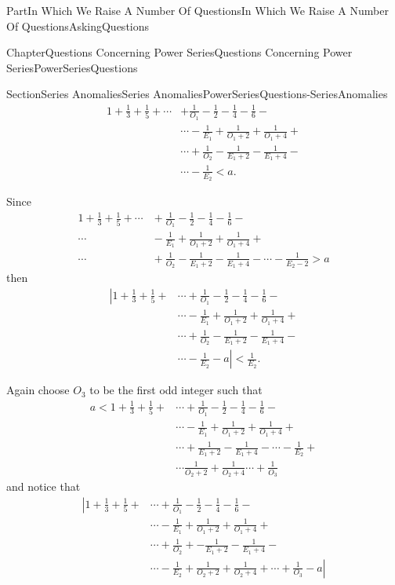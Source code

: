 \documentclass[oneside,10pt,]{book}
\numberwithin{equation}{part}
\newcommand{\lt}{<}
\newcommand{\amp}{&}
\begin{document}
\begin{partptx}{Part}{In Which We Raise A Number Of Questions}{}{In Which We Raise A Number Of Questions}{}{}{AskingQuestions}
\begin{chapterptx}{Chapter}{Questions Concerning Power Series}{}{Questions Concerning Power Series}{}{}{PowerSeriesQuestions}
\begin{sectionptx}{Section}{Series Anomalies}{}{Series Anomalies}{}{}{PowerSeriesQuestions-SeriesAnomalies}
\begin{align*}
1+\frac{1}{3}+\frac{1}{5}+\cdots\amp +\frac{1}{O_1}-\frac{1}{2}- \frac{1}{4}-\frac{1}{6}-\\
\amp \cdots -\frac{1}{E_1}+ \frac{1}{O_1+2}+\frac{1}{O_1+4}+\\
\amp \cdots+\frac{1}{O_2}-\frac{1}{E_1+2}-\frac{1}{E_1+4}-\\
\amp \cdots-\frac{1}{E_2}\lt a\text{.}
\end{align*}
%
\par
Since%
\begin{align*}
1+\frac{1}{3}+\frac{1}{5} +\cdots\amp{}+\frac{1}{O_1}-\frac{1}{2}- \frac{1}{4}-\frac{1}{6}-\\
\cdots\amp{}-\frac{1}{E_1}+ \frac{1}{O_1+2}+\frac{1}{O_1+4}+\\
\cdots\amp{}+\frac{1}{O_2}- \frac{1}{E_1+2}-\frac{1}{E_1+4}-\cdots-\frac{1}{E_2-2}>a
\end{align*}
then%
\begin{align*}
\left|1+\frac{1}{3}\right.+\frac{1}{5}+
\amp \cdots+\frac{1}{O_1}-\frac{1}{2}-
\frac{1}{4}-\frac{1}{6}-\\
\amp{}\cdots-\frac{1}{E_1} +\frac{1}{O_1+2}+\frac{1}{O_1+4}+\\
\amp{}\cdots+\frac{1}{O_2}-
\frac{1}{E_1+2}-\frac{1}{E_1+4}-\\
\amp{}\cdots-\left.\frac{1}{E_2}-a\right|
\lt \frac{1}{E_2}.
\end{align*}
%
\par
Again choose \(O_3\) to be the first odd integer such that%
\begin{align*}
a\lt 1+\frac{1}{3} +\frac{1}{5}+
\amp{}\cdots+\frac{1}{O_1}-\frac{1}{2}-\frac{1}{4}- \frac{1}{6}-\\
\amp{}\cdots
-\frac{1}{E_1}+\frac{1}{O_1+2}+\frac{1}{O_1+4}+\\
\amp{}\cdots+\frac{1}{E_1+2}-\frac{1}{E_1+4}-\cdots -\frac{1}{E_2} +\\
\amp{} \cdots \frac{1}{O_2+2} + \frac{1}{O_2+4}\cdots+\frac{1}{O_3}
\end{align*}
and notice that%
\begin{align*}
\left|1+\frac{1}{3}\right.
+\frac{1}{5}+\amp{}\cdots+\frac{1}{O_1}-\frac{1}{2}-\frac{1}{4}-\frac{1}{6}-\\
\amp
\cdots-\frac{1}{E_1}+\frac{1}{O_1+2}+\frac{1}{O_1+4}+\\
\amp \cdots+ \frac{1}{O_2}+
-\frac{1}{E_1+2}-\frac{1}{E_1+4}-\\
\amp{}\cdots-\frac{1}{E_2}+\frac{1}{O_2+2}+
\frac{1}{O_2+4}+\cdots+\left.\frac{1}{O_3}-a\right|\\

\end{align*}
\end{sectionptx}
\end{chapterptx}
\end{partptx}
\end{document}
